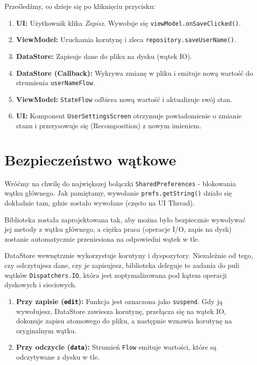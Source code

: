 Prześledźmy, co dzieje się po kliknięciu przycisku:
\begin{enumerate}
    \item \textbf{UI:} Użytkownik klika \textit{Zapisz}. Wywołuje się \texttt{viewModel.onSaveClicked()}.
    \item \textbf{ViewModel:} Uruchamia korutynę i zleca \texttt{repository.saveUserName()}.
    \item \textbf{DataStore:} Zapisuje dane do pliku na dysku (wątek IO).
    \item \textbf{DataStore (Callback):} Wykrywa zmianę w pliku i emituje nową wartość do strumienia \texttt{userNameFlow}.
    \item \textbf{ViewModel:} \texttt{StateFlow} odbiera nową wartość i aktualizuje swój stan.
    \item \textbf{UI:} Komponent \texttt{UserSettingsScreen} otrzymuje powiadomienie o zmianie stanu i przerysowuje się (Recomposition) z nowym imieniem.
\end{enumerate}

\section{Bezpieczeństwo wątkowe}

Wróćmy na chwilę do największej bolączki \texttt{SharedPreferences} - blokowania wątku głównego. Jak pamiętamy, wywołanie \texttt{prefs.getString()} działo się dokładnie tam, gdzie zostało wywołane (często na UI Thread).

Biblioteka została zaprojektowana tak, aby można było bezpiecznie wywoływać jej metody z wątku głównego, a ciężka praca (operacje I/O, zapis na dysk) zostanie automatycznie przeniesiona na odpowiedni wątek w tle.

DataStore wewnętrznie wykorzystuje korutyny i dyspozytory. Niezależnie od tego, czy odczytujesz dane, czy je zapisujesz, biblioteka deleguje te zadania do puli wątków \texttt{Dispatchers.IO}, która jest zoptymalizowana pod kątem operacji dyskowych i sieciowych.

\begin{enumerate}
    \item \textbf{Przy zapisie (\texttt{edit}):} Funkcja jest oznaczona jako \texttt{suspend}. Gdy ją wywołujesz, DataStore zawiesza korutynę, przełącza się na wątek IO, dokonuje zapisu atomowego do pliku, a następnie wznawia korutynę na oryginalnym wątku.
    \item \textbf{Przy odczycie (\texttt{data}):} Strumień \texttt{Flow} emituje wartości, które są odczytywane z dysku w tle.
\end{enumerate}


